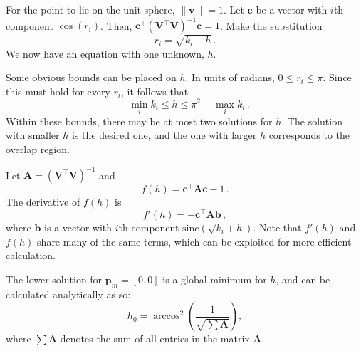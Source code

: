 \documentclass[]{interact}
\begin{document}
For the point to lie on the unit sphere, $\|\mathbf v\| = 1$. Let $\mathbf c$
be a vector with $i$th component $\cos\left(r_i \right)$. Then,
$\mathbf c^\top \left(\mathbf V^\top \mathbf V\right )^{-1} \mathbf c = 1$.
Make the substitution
\begin{equation}\label{eq:inverser}
  r_i = \sqrt{k_i + h} \,.
\end{equation} We now have an equation with one unknown, $h$.

Some obvious bounds can be placed on $h$. In units of radians,
$0 \le r_i \le \pi$. Since this must hold for every $r_i$, it follows that
\begin{equation}
   -\min_i k_i \le h \le \pi^2 - \max_i k_i \,.
\end{equation}
Within these bounds, there may be at most two solutions for $h$. The solution
with smaller $h$ is the desired one, and the one with larger $h$ corresponds to
the overlap region.

Let $\mathbf A = \left(\mathbf V^\top \mathbf V\right )^{-1}$ and
\begin{equation}\label{eq:inversefh}
f(h) = \mathbf c^\top \mathbf A \mathbf c - 1 \,.
\end{equation}
The derivative of $f(h)$ is
\begin{equation}\label{eq:inversefph}
  f'(h) = -\mathbf c^\top \mathbf A \mathbf b \,,
\end{equation}
where $\mathbf b$ is a vector with $i$th component
$\mathrm{sinc}\left(\sqrt{k_i + h}\right)$.
Note that $f'(h)$ and $f(h)$ share many of the same terms,
which can be exploited for more efficient calculation.



The lower solution for $\mathbf p_m = [0, 0]$ is a
global minimum for $h$, and can be calculated analytically as so:
\begin{equation}
  h_0 = \arccos^2 \left(\frac{1}{\sqrt{\sum \mathbf A }} \right) ,
\end{equation}
where $\sum \mathbf A$ denotes the sum of all entries in the matrix $\mathbf A$.
\end{document}
